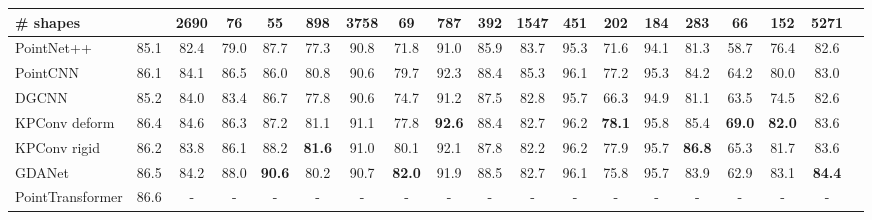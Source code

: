 \documentclass[acmtog, authorversion]{acmart}
\begin{document}
\begin{table*}
\begin{center}
{\begin{tabular}{l|c|ccccccccccccccccr}
                \midrule
                \# shapes       &                    & 2690          & 76            & 55            & 898           & 3758          & 69            & 787           & 392           & 1547          & 451           & 202           & 184           & 283           & 66     & 152   & 5271          & \\
                \midrule
                PointNet++      & 85.1               & 82.4          & 79.0          & 87.7          & 77.3          & 90.8          & 71.8          & 91.0          & 85.9          & 83.7          & 95.3          & 71.6          & 94.1          & 81.3          & 58.7   & 76.4  & 82.6            \\
                PointCNN        & 86.1               & 84.1          & 86.5          & 86.0          & 80.8          & 90.6          & 79.7          & 92.3          & 88.4 & 85.3          & 96.1          & 77.2          & 95.3          & 84.2          & 64.2   & 80.0  & 83.0            \\
                DGCNN           & 85.2               & 84.0          & 83.4          & 86.7          & 77.8          & 90.6          & 74.7          & 91.2          & 87.5          & 82.8          & 95.7          & 66.3          & 94.9          & 81.1          & 63.5   & 74.5  & 82.6            \\
                KPConv deform   & 86.4               & 84.6          & 86.3          & 87.2          & 81.1          & 91.1          & 77.8          & \textbf{92.6} & 88.4 & 82.7          & 96.2          & \textbf{78.1} & 95.8
                                & 85.4               & \textbf{69.0} & \textbf{82.0} & 83.6                                                                                                                                                                                                             \\
                KPConv rigid    & 86.2               & 83.8          & 86.1          & 88.2          & \textbf{81.6} & 91.0          & 80.1          & 92.1          & 87.8          & 82.2          & 96.2          & 77.9          & 95.7          & \textbf{86.8} & 65.3   & 81.7  & 83.6            \\
                GDANet  & 86.5 & 84.2 & 88.0 & \textbf{90.6} & 80.2 & 90.7 & \textbf{82.0} & 91.9 & 88.5 & 82.7 & 96.1 & 75.8 & 95.7 & 83.9 & 62.9 & 83.1 & \textbf{84.4} \\
                PointTransformer & 86.6 & - & - & - & - & - & - & - & - & - & - & - & - & - & - & - & - \\

\end{tabular}}
\end{center}
\end{table*}
\end{document}

